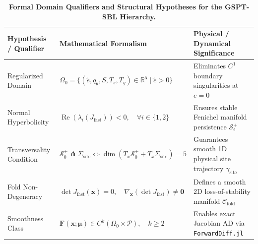 \begin{table}[h]
\centering
\caption{\textbf{Formal Domain Qualifiers and Structural Hypotheses for the GSPT-SBL Hierarchy.}}
\label{tab:mathematical_hypotheses}
\small
\begin{tabular}{lll}
\toprule
\textbf{Hypothesis / Qualifier} & \textbf{Mathematical Formalism} & \textbf{Physical / Dynamical Significance} \\
\midrule
Regularized Domain & $\Omega_0 = \{ (\tilde e, q_\theta, S, T_s, T_g) \in \mathbb{R}^5 \mid \tilde e > 0 \}$ & Eliminates $C^1$ boundary singularities at $e = 0$ \\
Normal Hyperbolicity & $\operatorname{Re}\left(\lambda_i\left(J_{\mathrm{fast}}\right)\right) < 0, \quad \forall i \in \{1, 2\}$ & Ensures stable Fenichel manifold persistence $\mathcal{S}_\epsilon^+$ \\
Transversality Condition & $\mathcal{S}_0^+ \pitchfork \Sigma_{\mathrm{site}} \iff \operatorname{dim}(T_x\mathcal{S}_0^+ + T_x\Sigma_{\mathrm{site}}) = 5$ & Guarantees smooth 1D physical site trajectory $\gamma_{\mathrm{site}}$ \\
Fold Non-Degeneracy & $\det J_{\mathrm{fast}}(\mathbf{x}) = 0, \quad \nabla_{\mathbf{x}}(\det J_{\mathrm{fast}}) \neq \mathbf{0}$ & Defines a smooth 2D loss-of-stability manifold $\mathcal{C}_{\mathrm{fold}}$ \\
Smoothness Class & $\mathbf{F}(\mathbf{x}; \boldsymbol{\mu}) \in C^k(\Omega_0 \times \mathcal{P}), \quad k \ge 2$ & Enables exact Jacobian AD via \texttt{ForwardDiff.jl} \\
\bottomrule
\end{tabular}
\end{table}

